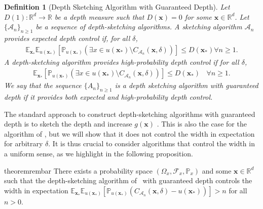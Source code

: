 \documentclass{article} %
\newtheorem{definition}{Definition}[section]
\theoremstyle{remark}
\theoremstyle{definition}      %
\begin{document}
\begin{definition}[Depth Sketching Algorithm with Guaranteed Depth] \label{def:exp_depth_sketch_alg}
  Let $D(1) : \mathbb{R}^d \rightarrow \mathbb{R}$ be a depth measure such that $D(\bm{x}) = 0$ for some  $\bm{x} \in \mathbb{R}^d$. Let $\{\mathcal{A}_n\}_{n \geq 1}$ be a sequence of depth-sketching algorithms. 
  A sketching algorithm $\mathcal{A}_n$ provides \emph{expected depth control} if, for all $\delta$,
  \begin{align}
    \mathbb{E}_{\bm{x}_*} \mathbb{E}_{u(\bm{x_*})}[\mathbb{P}_{u(\bm{x_*})}(\exists x \in u(\bm{x_*}) \setminus C_{\mathcal{A}_n}(\bm{x},\delta))]  \leq D(\bm{x_*})   \forall n \geq 1.
\end{align}
A depth-sketching algorithm provides \emph{high-probability depth control} if for all $\delta$,
\begin{align}
  \mathbb{E}_{\bm{x}_*}[\mathbb{P}_{u(\bm{x_*})}(\exists x \in u(\bm{x_*}) \setminus C_{\mathcal{A}_n}(\bm{x},\delta))]  \leq D(\bm{x_*})  ~~~~ \forall n \geq 1.
\end{align}
We say that the sequence $\{A_n\}_{n \geq 1}$ is a depth sketching algorithm with guaranteed depth if it provides both expected and high-probability depth control.
\end{definition}

The standard approach to construct depth-sketching algorithms with guaranteed depth is to sketch the depth and increase $g(\bm{x})$ \citep[see, e.g.,][Sec. 5.2]{angelopoulos2024conformal}. This is also the case for the algorithm of  \citet{angelopoulos2024conformal}, but we will show that it does not control the width in expectation for arbitrary $\delta$. It is thus crucial to consider algorithms that control the width in a uniform sense, as we highlight in the following proposition.

\begin{restatable}{theorem}{rembar}\label{prop:rem}
  There exists a probability space $(\Omega_x, \mathcal{F}_x,\mathbb{P}_x)$ and some $\bm{x} \in \mathbb{R}^d$ such that the depth-sketching algorithm of~\cite{angelopoulos2024conformal} with guaranteed depth controls the width in expectation $\mathbb{E}_{\bm{x}_*} \mathbb{E}_{u(\bm{x_*})}[\mathbb{P}_{u(\bm{x_*})}(C_{\mathcal{A}_n}(\bm{x},\delta) - u(\bm{x_*}))] > n$ for all $n > 0.$
\end{restatable}
\end{document}
